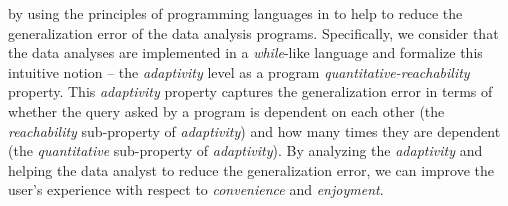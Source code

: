 by using the principles of programming languages in 
to help to reduce the generalization error of the data analysis programs.
Specifically, we consider that the data analyses are implemented in a \emph{while}-like language and formalize this intuitive notion -- the \emph{adaptivity} level as a program \emph{quantitative-reachability} property.
This \emph{adaptivity} property captures the generalization error in terms of whether the query asked by a program is dependent on each other (the \emph{reachability} sub-property of \emph{adaptivity}) and how many times they are dependent (the \emph{quantitative} sub-property of \emph{adaptivity}).
By analyzing the \emph{adaptivity} and helping the data analyst to reduce the generalization error,
we can
improve the user's experience with respect to \emph{convenience} and \emph{enjoyment}.


